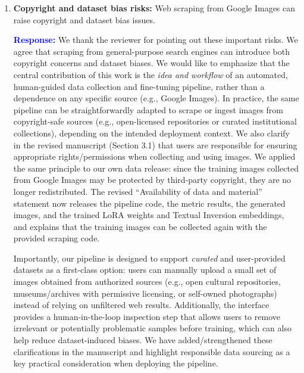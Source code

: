 \documentclass[11pt]{article}
\begin{document}
\begin{enumerate}[label=\textbf{C\arabic*.}, leftmargin=*]
We fully agree that rigorous sociocultural validation (e.g., evaluation by cultural experts or affected communities) and user studies would further strengthen this line of work, and we have therefore explicitly acknowledged them as key directions for future research.

\item \textbf{Copyright and dataset bias risks:} Web scraping from Google Images can raise copyright and dataset bias issues.

\textbf{\textcolor{blue}{Response:}} We thank the reviewer for pointing out these important risks. We agree that scraping from general-purpose search engines can introduce both copyright concerns and dataset biases. We would like to emphasize that the central contribution of this work is the \emph{idea and workflow} of an automated, human-guided data collection and fine-tuning pipeline, rather than a dependence on any specific source (e.g., Google Images). In practice, the same pipeline can be straightforwardly adapted to scrape or ingest images from copyright-safe sources (e.g., open-licensed repositories or curated institutional collections), depending on the intended deployment context. We also clarify in the revised manuscript (Section 3.1) that users are responsible for ensuring appropriate rights/permissions when collecting and using images. We applied the same principle to our own data release: since the training images collected from Google Images may be protected by third-party copyright, they are no longer redistributed. The revised ``Availability of data and material'' statement now releases the pipeline code, the metric results, the generated images, and the trained LoRA weights and Textual Inversion embeddings, and explains that the training images can be collected again with the provided scraping code.

Importantly, our pipeline is designed to support \emph{curated} and user-provided datasets as a first-class option: users can manually upload a small set of images obtained from authorized sources (e.g., open cultural repositories, museums/archives with permissive licensing, or self-owned photographs) instead of relying on unfiltered web results. Additionally, the interface provides a human-in-the-loop inspection step that allows users to remove irrelevant or potentially problematic samples before training, which can also help reduce dataset-induced biases. We have added/strengthened these clarifications in the manuscript and highlight responsible data sourcing as a key practical consideration when deploying the pipeline.
\end{enumerate}
\end{document}
